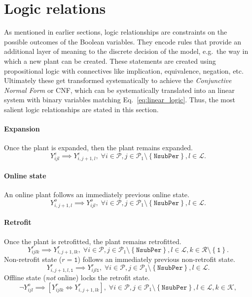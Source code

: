 \documentclass{amsbook}
\begin{document}
\section{Logic relations}\label{sec:logic_relations}
%
As mentioned in earlier sections, logic relationships are constraints on the
possible outcomes of the Boolean variables. They encode rules
that provide an additional layer of meaning to the discrete decision of the
model, e.g.\ the way in which a new plant can be created. 
These statements are created using propositional logic with connectives like
implication, equivalence, negation, etc. Ultimately these get transformed
systematically to achieve the \emph{Conjunctive Normal Form} or CNF, which can
be systematically translated into an linear system with binary variables
matching Eq.~\eqref{eq:linear_logic}.
%
Thus, the most salient logic relationships are stated in this section. 
%
\paragraph{Expansion}
%
Once the plant is expanded, then the plant remains expanded.
%
\begin{equation}
    Y^e_{ijl} \implies Y^e_{i, j+1, l}, \; \forall 
    i \in \mathcal{P},
    j \in \mathcal{P}_1 \setminus \left\{\mathtt{NsubPer}\right\},
    l\in \mathcal{L}.
\end{equation}
%
\paragraph{Online state}
An online plant follows an immediately previous online state.
%
\begin{equation}
    Y^o_{i,j+1,l} \implies Y^o_{ijl}, \; \forall 
    i \in \mathcal{P},
    j \in \mathcal{P}_1 \setminus \left\{\mathtt{NsubPer}\right\},
    l\in \mathcal{L}.
\end{equation}
%
\paragraph{Retrofit}
%
Once the plant is retrofitted, the plant remains retrofitted.
%
\begin{equation}
    Y^r_{ijlk} \implies Y^r_{i, j+1, lk}, \; \forall 
    i \in \mathcal{P},
    j \in \mathcal{P}_1 \setminus \left\{\mathtt{NsubPer}\right\},
    l\in \mathcal{L},
    k\in \mathcal{R} \setminus \left\{\mathtt{1}\right\}.
\end{equation}
%
Non-retrofit state ($r=\mathtt{1}$) follows an immediately previous non-retrofit
state.
%
\begin{equation}
    Y^r_{i, j+1, l,\mathtt{1}} \implies Y^r_{ijl\mathtt{1}} , \; \forall 
    i \in \mathcal{P},
    j \in \mathcal{P}_1 \setminus \left\{\mathtt{NsubPer}\right\},
    l\in \mathcal{L}.
\end{equation}
%
Offline state (\emph{not} online) locks the retrofit state.
%
\begin{equation}
    \neg Y^o_{ijl} \implies \left[Y^r_{ijlk} \iff Y^r_{i,j+1,lk}\right]
    , \; \forall
    i \in \mathcal{P},
    j \in \mathcal{P}_1 \setminus \left\{\mathtt{NsubPer}\right\},
    l \in \mathcal{L},
    k \in \mathcal{K},
\end{equation}
%
\end{document}
